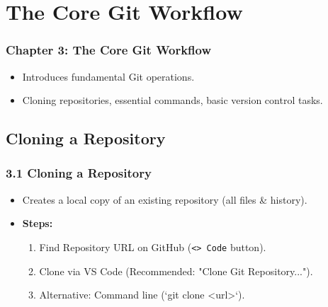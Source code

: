 \documentclass{beamer}
\begin{document}
\section{The Core Git Workflow}
\begin{frame}
  \frametitle{Chapter 3: The Core Git Workflow}
  \begin{itemize}
    \item Introduces fundamental Git operations.
    \item Cloning repositories, essential commands, basic version control tasks.
  \end{itemize}
\end{frame}

\subsection{Cloning a Repository}
\begin{frame}
  \frametitle{3.1 Cloning a Repository}
  \begin{itemize}
    \item Creates a local copy of an existing repository (all files \& history).
    \item \textbf{Steps:}
    \begin{enumerate}
        \item Find Repository URL on GitHub (\texttt{<> Code} button).
        \item Clone via VS Code (Recommended: "Clone Git Repository...").
        \item Alternative: Command line (`git clone <url>`).
    \end{enumerate}
  \end{itemize}
\end{frame}
\end{document}
